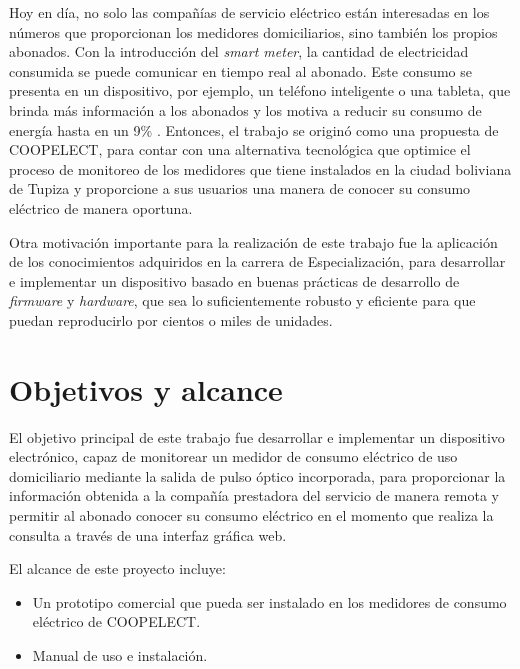 Hoy en día, no solo las compañías de servicio eléctrico están interesadas en los números que proporcionan los medidores domiciliarios, sino también los propios abonados. Con la introducción del \textit{smart meter}, la cantidad de electricidad consumida se puede comunicar en tiempo real al abonado. Este consumo se presenta en un dispositivo, por ejemplo, un teléfono inteligente o una tableta, que brinda más información a los abonados y los motiva a reducir su consumo de energía hasta en un 9\% \citep{WEBSITE:8}. Entonces, el trabajo se originó como una propuesta de COOPELECT, para contar con una alternativa tecnológica que optimice el proceso de monitoreo de los medidores que tiene instalados en la ciudad boliviana de Tupiza y proporcione a sus usuarios una manera de conocer su consumo eléctrico de manera oportuna.

Otra motivación importante para la realización de este trabajo fue la aplicación de los conocimientos adquiridos en la carrera de Especialización, para desarrollar e implementar un dispositivo basado en buenas prácticas de desarrollo de \textit{firmware} y \textit{hardware}, que sea lo suficientemente robusto y eficiente para que puedan reproducirlo por cientos o miles de unidades.


\section{Objetivos y alcance}

El objetivo principal de este trabajo fue desarrollar e implementar un dispositivo electrónico, capaz de monitorear un medidor de consumo eléctrico de uso domiciliario mediante la salida de pulso óptico incorporada, para proporcionar la información obtenida a la compañía prestadora del servicio de manera remota y permitir al abonado conocer su consumo eléctrico en el momento que realiza la consulta a través de una interfaz gráfica web.

El alcance de este proyecto incluye:

\begin{itemize}
	\item Un prototipo comercial que pueda ser instalado en los medidores de consumo eléctrico de COOPELECT.
	\item Manual de uso e instalación.
\end{itemize}